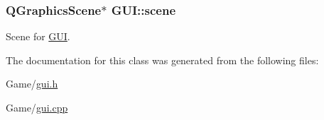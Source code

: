 \subsubsection[{\texorpdfstring{scene}{scene}}]{\setlength{\rightskip}{0pt plus 5cm}Q\+Graphics\+Scene$\ast$ G\+U\+I\+::scene}\hypertarget{class_g_u_i_a52022e4c94d0e0378ed17b2348ed02db}{}\label{class_g_u_i_a52022e4c94d0e0378ed17b2348ed02db}


Scene for \hyperlink{class_g_u_i}{G\+UI}. 



The documentation for this class was generated from the following files\+:\begin{DoxyCompactItemize}
\item 
Game/\hyperlink{gui_8h}{gui.\+h}\item 
Game/\hyperlink{gui_8cpp}{gui.\+cpp}\end{DoxyCompactItemize}
